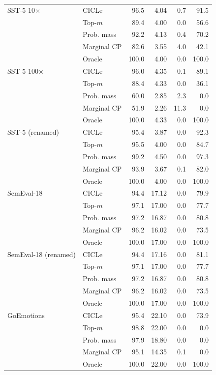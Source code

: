 \begin{tabular}{llrrrr}
\addlinespace
SST-5 10$\times$ & CICLe & 96.5 & 4.04 & 0.7 & 91.5 \\
 & Top-$m$ & 89.4 & 4.00 & 0.0 & 56.6 \\
 & Prob. mass & 92.2 & 4.13 & 0.4 & 70.2 \\
 & Marginal CP & 82.6 & 3.55 & 4.0 & 42.1 \\
 & Oracle & 100.0 & 4.00 & 0.0 & 100.0 \\
\addlinespace
SST-5 100$\times$ & CICLe & 96.0 & 4.35 & 0.1 & 89.1 \\
 & Top-$m$ & 88.4 & 4.33 & 0.0 & 36.1 \\
 & Prob. mass & 60.0 & 2.85 & 2.3 & 0.0 \\
 & Marginal CP & 51.9 & 2.26 & 11.3 & 0.0 \\
 & Oracle & 100.0 & 4.33 & 0.0 & 100.0 \\
\addlinespace
SST-5 (renamed) & CICLe & 95.4 & 3.87 & 0.0 & 92.3 \\
 & Top-$m$ & 95.5 & 4.00 & 0.0 & 84.7 \\
 & Prob. mass & 99.2 & 4.50 & 0.0 & 97.3 \\
 & Marginal CP & 93.9 & 3.67 & 0.1 & 82.0 \\
 & Oracle & 100.0 & 4.00 & 0.0 & 100.0 \\
\addlinespace
SemEval-18 & CICLe & 94.4 & 17.12 & 0.0 & 79.9 \\
 & Top-$m$ & 97.1 & 17.00 & 0.0 & 77.7 \\
 & Prob. mass & 97.2 & 16.87 & 0.0 & 80.8 \\
 & Marginal CP & 96.2 & 16.02 & 0.0 & 73.5 \\
 & Oracle & 100.0 & 17.00 & 0.0 & 100.0 \\
\addlinespace
SemEval-18 (renamed) & CICLe & 94.4 & 17.16 & 0.0 & 81.1 \\
 & Top-$m$ & 97.1 & 17.00 & 0.0 & 77.7 \\
 & Prob. mass & 97.2 & 16.87 & 0.0 & 80.8 \\
 & Marginal CP & 96.2 & 16.02 & 0.0 & 73.5 \\
 & Oracle & 100.0 & 17.00 & 0.0 & 100.0 \\
\addlinespace
GoEmotions & CICLe & 95.4 & 22.10 & 0.0 & 73.9 \\
 & Top-$m$ & 98.8 & 22.00 & 0.0 & 0.0 \\
 & Prob. mass & 97.9 & 18.80 & 0.0 & 0.0 \\
 & Marginal CP & 95.1 & 14.35 & 0.1 & 0.0 \\
 & Oracle & 100.0 & 22.00 & 0.0 & 100.0 \\

\end{tabular}
